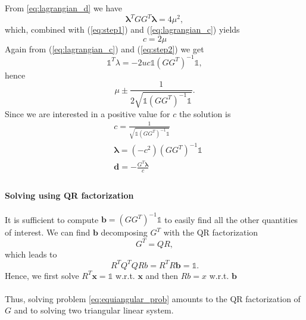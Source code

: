 \documentclass{article}
\renewcommand{\vec}[1]{\boldsymbol{#1}}
\newcommand{\onevec}{\mathds{1}}
\begin{document}
From \ref{eq:lagrangian_d} we have
\begin{equation}
	\vec{\lambda}^T GG^T \vec{\lambda} = 4\mu^2,
\end{equation} which, combined with (\ref{eq:step1}) and (\ref{eq:lagrangian_c}) yields
\begin{equation}
	c = 2\mu
\end{equation}
Again from (\ref{eq:lagrangian_c}) and (\ref{eq:step2}) we get
\begin{equation}
	\onevec^T\lambda = -2uc \onevec(GG^T)^{-1}\onevec,
\end{equation} hence 
\begin{equation}
	\mu \pm \frac{1}{2\sqrt{\onevec(GG^T)^{-1}\onevec}}.
\end{equation}
Since we are interested in a positive value for $c$ the solution is
\begin{align}
	& c = \frac{1}{\sqrt{\onevec(GG^T)^{-1}\onevec}}\\
	&\vec{\lambda} = (-c^2)(GG^T)^{-1} \onevec\\
	&\vec{d} = -\frac{G^T\vec{\lambda}}{c}\\
\end{align}

\paragraph{Solving using QR factorization}

It is sufficient to compute $\vec{b}=(GG^T)^{-1}\onevec$ to easily find all the other quantities of interest. We can find $\vec{b}$ decomposing $G^T$ with the QR factorization
\begin{equation}
	G^T=QR,
\end{equation}
which leads to 
\begin{equation}
	R^TQ^TQRb=R^TR\vec{b}=\onevec.
\end{equation}
Hence, we first solve $R^T\vec{x}=\onevec$ w.r.t. $\vec{x}$ and then $Rb = x$ w.r.t. $\vec{b}$
\\\\
Thus, solving problem \ref{eq:equiangular_prob} amounts to the QR factorization of $G$ and to solving two triangular linear system.
\end{document}

